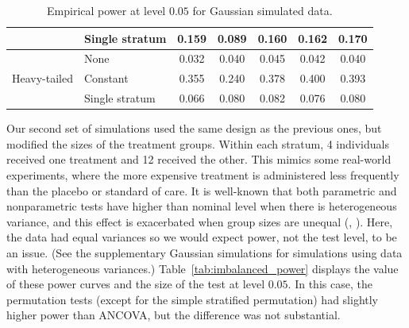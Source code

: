 \documentclass[12pt]{article}
\begin{document}
\begin{table}[]
\begin{tabular}{ll|ccccc}
                              & Single stratum                                              & 0.159                      & 0.089                                                                                & 0.160                                                                                 & 0.162                                                                        & 0.170                                                                        \\ \hline
\multirow{3}{*}{Heavy-tailed} & None                                                        & 0.032                      & 0.040                                                                                & 0.045                                                                                 & 0.042                                                                        & 0.040                                                                        \\
                              & Constant                                                    & 0.355                      & 0.240                                                                                & 0.378                                                                                 & 0.400                                                                        & 0.393                                                                        \\
                              & Single stratum                                              & 0.066                      & 0.080                                                                                & 0.082                                                                                 & 0.076                                                                        & 0.080                                                                        \\ \hline
\end{tabular}
\caption{Empirical power at level $0.05$ for Gaussian simulated data.}
\end{table}

Our second set of simulations used the same design as the previous ones, but modified the sizes of the treatment groups.
Within each stratum, 4 individuals received one treatment and 12 received the other.
This mimics some real-world experiments, where the more expensive treatment is administered less frequently than the placebo or standard of care.
It is well-known that both parametric and nonparametric tests have higher than nominal level when there is heterogeneous variance, and this effect is exacerbated when group sizes are unequal (\cite{glass_consequences_1972}, \cite{zimmerman_two_2006}).
Here, the data had equal variances so we would expect power, not the test level, to be an issue.
(See the supplementary Gaussian simulations for simulations using data with heterogeneous variances.)
Table~\ref{tab:imbalanced_power} displays the value of these power curves and the size of the test at level $0.05$.
In this case, the permutation tests (except for the simple stratified permutation) had slightly higher power than ANCOVA, but the difference was not substantial.
\end{document}
